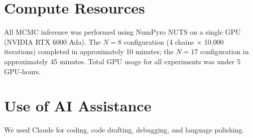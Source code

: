 \section{Compute Resources}
\label{app:compute}

All MCMC inference was performed using NumPyro NUTS on a single GPU (NVIDIA RTX 6000 Ada). The $N = 8$ configuration (4 chains $\times$ 10{,}000 iterations) completed in approximately 10 minutes; the $N = 17$ configuration in approximately 45 minutes. Total GPU usage for all experiments was under 5 GPU-hours.


\section{Use of AI Assistance}

We used Claude for coding, code drafting, debugging, and language polishing.

